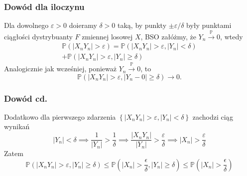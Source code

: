 \documentclass{beamer}
\begin{document}
	
	\begin{frame}
		\frametitle{Dowód dla iloczynu}
		Dla dowolnego $\varepsilon>0$ doieramy $\delta>0$ taką, by punkty $\pm\varepsilon/\delta$ były punktami ciągłości dystrybuanty $F$ zmiennej losowej $X$, BSO załóżmy, że $Y_n\xrightarrow{\mathbb{P}}0$, wtedy\pause
		\begin{equation}
			\begin{split}
				\mathbb{P}\left(|X_nY_n|>\varepsilon\right)=\mathbb{P}\left(|X_nY_n|>\varepsilon,|Y_n|<\delta\right)\\+
				\mathbb{P}\left(|X_nY_n|>\varepsilon,|Y_n|\geq\delta\right)
			\end{split}
		\end{equation}\pause
		Analogicznie jak wcześniej, ponieważ $Y_n\xrightarrow{\mathbb{P}}0$, to
		\begin{equation}
			\mathbb{P}\left(|X_nY_n|>\varepsilon,|Y_n-0|\geq\delta\right)\to0.
		\end{equation}
	\end{frame}

	\begin{frame}
		\frametitle{Dowód cd.}
		Dodatkowo dla pierwszego zdarzenia $\left\{|X_nY_n|>\varepsilon,|Y_n|<\delta\right\}$ zachodzi ciąg wynikań
		\begin{equation}
			|Y_n|<\delta\implies\frac{1}{|Y_n|}>\frac{1}{\delta}\implies\frac{|X_nY_n|}{|Y_n|}>\frac{\varepsilon}{\delta}\implies|X_n|>\frac{\varepsilon}{\delta}
		\end{equation}\pause
		Zatem
		\begin{equation}
			\mathbb{P}\left(|X_nY_n|>\varepsilon,|Y_n|\geq\delta\right)\leq
			\mathbb{P}\left(|X_n|>\frac{\epsilon}{\delta},|Y_n|\geq\delta\right)\leq
			\mathbb{P}\left(|X_n|>\frac{\epsilon}{\delta}\right)
		\end{equation}
	\end{frame}
\end{document}
